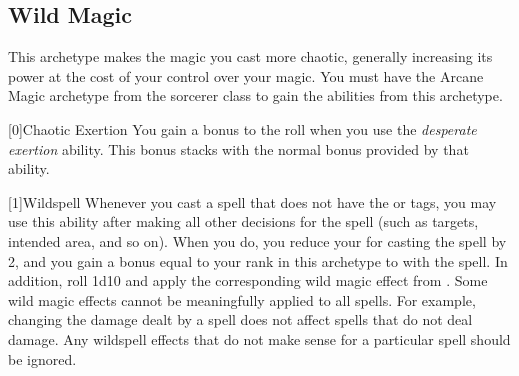     \newpage
    \subsection{Wild Magic}
        This archetype makes the magic you cast more chaotic, generally increasing its power at the cost of your control over your magic.
        You must have the Arcane Magic archetype from the sorcerer class to gain the abilities from this archetype.

        [0]{Chaotic Exertion} You gain a  bonus to the roll when you use the \textit{desperate exertion} ability.
        This bonus stacks with the normal  bonus provided by that ability.

        [1]{Wildspell} Whenever you cast a spell that does not have the  or  tags, you may use this ability after making all other decisions for the spell (such as targets, intended area, and so on).
        When you do, you reduce your  for casting the spell by 2, and you gain a bonus equal to your rank in this archetype to  with the spell.
        In addition, roll 1d10 and apply the corresponding wild magic effect from .
        Some wild magic effects cannot be meaningfully applied to all spells.
        For example, changing the damage dealt by a spell does not affect spells that do not deal damage.
        Any wildspell effects that do not make sense for a particular spell should be ignored.

